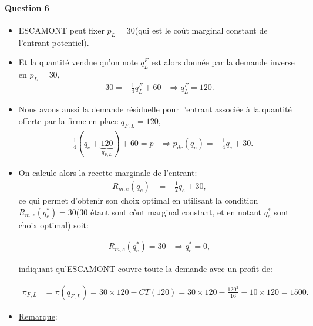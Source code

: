 \documentclass[notes, ignorenonframetext, compress, 9pt, xcolor=svgnames, aspectratio=169]{beamer}
\begin{document}
\begin{frame}
  [allowframebreaks]{\insertsection}
  \framesubtitle{Question 6}
  \begin{itemize}
    \item ESCAMONT peut fixer  $p_L = 30$(qui est le coût marginal constant de l'entrant potentiel).
    \item Et la quantité vendue qu'on note $q_L^F$ est alors donnée par la demande inverse en $p_L = 30$,
    \begin{align*}
    30 = -\frac{1}{4}q_L^F + 60 &\Rightarrow q_L^F = 120.
    \end{align*}
    \item Nous avons aussi la demande résiduelle pour l'entrant associée à la quantité offerte par la firme en place $q_{F,L} = 120$,
    \begin{align*}
    -\frac{1}{4}(q_e + \underbrace{120}_{q_{F, L}}) + 60 = p &\Rightarrow p_{dr}(q_e) = -\frac{1}{4}q_e +30.
    \end{align*}
    \item On calcule alors la recette marginale de l'entrant:
    \begin{align*}
    R_{m, e}(q_e) &= -\frac{1}{2}q_e +30,
    \end{align*}
    ce qui permet d'obtenir son choix optimal en utilisant la condition $R_{m, e}(q_e^*)  = 30$(30 étant sont côut marginal constant, et en notant $q_e^*$ sont choix optimal) soit: 
     
     
     \begin{align*}
    R_{m, e}(q_e^*) = 30 &\Rightarrow q_e^* = 0,
    \end{align*}
    
  indiquant qu'ESCAMONT couvre toute la demande avec un profit de:
  
   \begin{align*}
    \pi_{F, L} &= \pi(q_{F,L}) = 30\times 120 - CT(120) =   30\times 120 - \frac{120^2}{16} - 10\times 120 = 1500.
    \end{align*}
    
    \framebreak
    
    \item \underline{Remarque}:
    

\end{itemize}
\end{frame}
\end{document}
